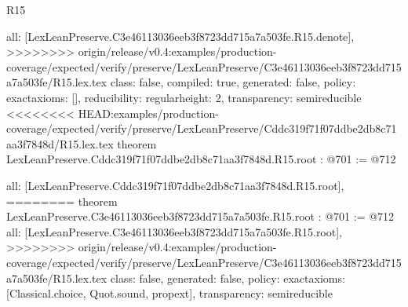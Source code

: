 \begin{lexlean}{R15}
\begin{coremodule}
{{{{{  all: [LexLeanPreserve.C3e46113036eeb3f8723dd715a7a503fe.R15.denote],
>>>>>>>> origin/release/v0.4:examples/production-coverage/expected/verify/preserve/LexLeanPreserve/C3e46113036eeb3f8723dd715a7a503fe/R15.lex.tex
  class: false,
  compiled: true,
  generated: false,
  policy: exact{axioms: []},
  reducibility: regular{height: 2},
  transparency: semireducible
}
<<<<<<<< HEAD:examples/production-coverage/expected/verify/preserve/LexLeanPreserve/Cddc319f71f07ddbe2db8c71aa3f7848d/R15.lex.tex
theorem LexLeanPreserve.Cddc319f71f07ddbe2db8c71aa3f7848d.R15.root : @701 := @712 {
  all: [LexLeanPreserve.Cddc319f71f07ddbe2db8c71aa3f7848d.R15.root],
========
theorem LexLeanPreserve.C3e46113036eeb3f8723dd715a7a503fe.R15.root : @701 := @712 {
  all: [LexLeanPreserve.C3e46113036eeb3f8723dd715a7a503fe.R15.root],
>>>>>>>> origin/release/v0.4:examples/production-coverage/expected/verify/preserve/LexLeanPreserve/C3e46113036eeb3f8723dd715a7a503fe/R15.lex.tex
  class: false,
  generated: false,
  policy: exact{axioms: [Classical.choice, Quot.sound, propext]},
  transparency: semireducible
}

}}}}}
\end{coremodule}
\end{lexlean}
